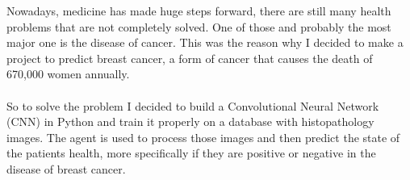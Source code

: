 \begin{minipage}{\textwidth}
Nowadays, medicine has made huge steps forward, there are still many health problems that are not completely solved. One of those and probably the most major one is the disease of cancer. This was the reason why I decided to make a project to predict breast cancer, a form of cancer that causes the death of 670,000 women annually. \\~\\
So to solve the problem I decided to build a Convolutional Neural Network (CNN) in Python and train it properly on a database with histopathology images. The agent is used to process those images and then predict the state of the patients health, more specifically if they are positive or negative in the disease of breast cancer. 
\end{minipage}